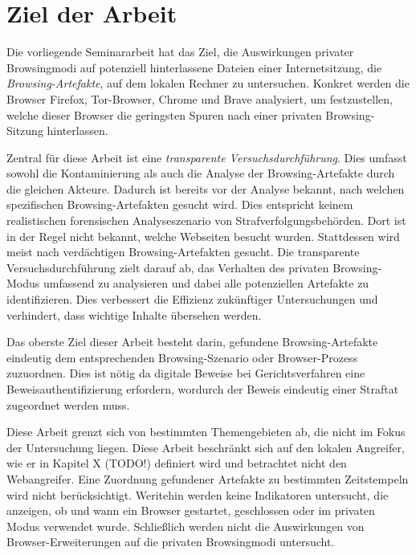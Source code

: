 \chapter{Ziel der Arbeit}
Die vorliegende Seminararbeit hat das Ziel, die Auswirkungen privater Browsingmodi auf potenziell hinterlassene Dateien einer Internetsitzung, die \textit{Browsing-Artefakte}, auf dem lokalen Rechner zu untersuchen. Konkret werden die Browser Firefox, Tor-Browser, Chrome und Brave analysiert, um festzustellen, welche dieser Browser die geringsten Spuren nach einer privaten Browsing-Sitzung hinterlassen.

Zentral für diese Arbeit ist eine \textit{transparente Versuchsdurchführung}. Dies umfasst sowohl die Kontaminierung als auch die Analyse der Browsing-Artefakte durch die gleichen Akteure. Dadurch ist bereits vor der Analyse bekannt, nach welchen spezifischen Browsing-Artefakten gesucht wird. Dies entspricht keinem realistischen forensischen Analyseszenario von Strafverfolgungsbehörden. Dort ist in der Regel nicht bekannt, welche Webseiten besucht wurden. Stattdessen wird meist nach verdächtigen Browsing-Artefakten gesucht.
Die transparente Versuchsdurchführung zielt darauf ab, das Verhalten des privaten Browsing-Modus umfassend zu analysieren und dabei alle potenziellen Artefakte zu identifizieren. Dies verbessert die Effizienz zukünftiger Untersuchungen und verhindert, dass wichtige Inhalte übersehen werden. \cite{Horsman.2019}

Das oberste Ziel dieser Arbeit besteht darin, gefundene Browsing-Artefakte eindeutig dem entsprechenden Browsing-Szenario oder Browser-Prozess zuzuordnen. 
Dies ist nötig da digitale Beweise bei Gerichtsverfahren eine Beweisauthentifizierung erfordern, wordurch der Beweis eindeutig einer Straftat zugeordnet werden muss.

Diese Arbeit grenzt sich von bestimmten Themengebieten ab, die nicht im Fokus der Untersuchung liegen. Diese Arbeit beschränkt sich auf den lokalen Angreifer, wie er in Kapitel X (TODO!) definiert wird und betrachtet nicht den Webangreifer. Eine Zuordnung gefundener Artefakte zu bestimmten Zeitstempeln wird nicht berücksichtigt. 
Weritehin werden keine Indikatoren untersucht, die anzeigen, ob und wann ein Browser gestartet, geschlossen oder im privaten Modus verwendet wurde.
Schließlich werden nicht die Auswirkungen von Browser-Erweiterungen auf die privaten Browsingmodi untersucht.

